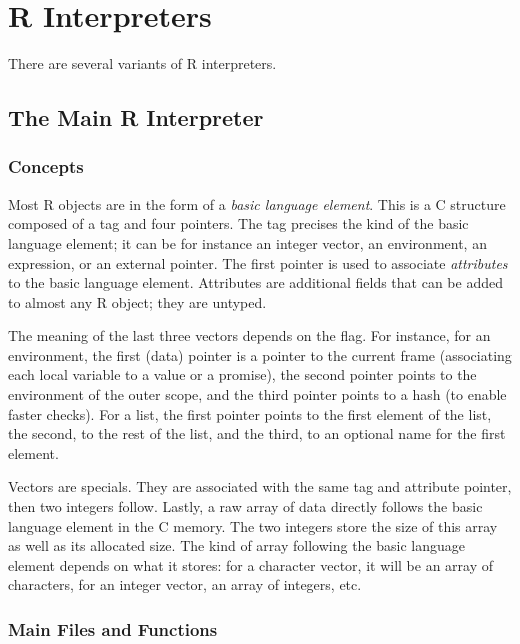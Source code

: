 \documentclass{article}
\newcommand\R{R}
\newcommand\Cn{C}
\begin{document}
\section{\R{} Interpreters}

There are several variants of \R{} interpreters.

\subsection{The Main \R{} Interpreter}

\subsubsection{Concepts}
\label{sec:concepts}

Most \R{} objects are in the form of a \emph{basic language element}.
This is a \Cn{} structure composed of a tag and four pointers.
The tag precises the kind of the basic language element;
it can be for instance an integer vector, an environment, an expression, or an external pointer.
The first pointer is used to associate \emph{attributes} to the basic language element.
Attributes are additional fields that can be added to almost any \R{} object;
they are untyped.

The meaning of the last three vectors depends on the flag.
%
For instance, for an environment, the first (data) pointer is a pointer
to the current frame (associating each local variable to a value or a promise),
the second pointer points to the environment of the outer scope,
and the third pointer points to a hash (to enable faster checks).
%
For a list, the first pointer points to the first element of the list,
the second, to the rest of the list,
and the third, to an optional name for the first element.

Vectors are specials.
They are associated with the same tag and attribute pointer,
then two integers follow.
Lastly, a raw array of data directly follows the basic language element in the \Cn{} memory.
The two integers store the size of this array as well as its allocated size.
The kind of array following the basic language element depends on what it stores:
for a character vector, it will be an array of characters,
for an integer vector, an array of integers, etc.


\subsubsection{Main Files and Functions}
\label{sec:files}
\end{document}
